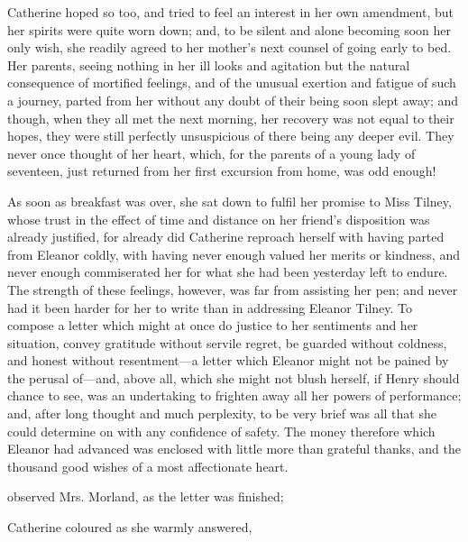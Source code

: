 Catherine hoped so too, and tried to feel an interest in her own amendment, but her spirits were quite worn down; and, to be silent and alone becoming soon her only wish, she readily agreed to her mother's next counsel of going early to bed. Her parents, seeing nothing in her ill looks and agitation but the natural consequence of mortified feelings, and of the unusual exertion and fatigue of such a journey, parted from her without any doubt of their being soon slept away; and though, when they all met the next morning, her recovery was not equal to their hopes, they were still perfectly unsuspicious of there being any deeper evil. They never once thought of her heart, which, for the parents of a young lady of seventeen, just returned from her first excursion from home, was odd enough!

As soon as breakfast was over, she sat down to fulfil her promise to Miss Tilney, whose trust in the effect of time and distance on her friend's disposition was already justified, for already did Catherine reproach herself with having parted from Eleanor coldly, with having never enough valued her merits or kindness, and never enough commiserated her for what she had been yesterday left to endure. The strength of these feelings, however, was far from assisting her pen; and never had it been harder for her to write than in addressing Eleanor Tilney. To compose a letter which might at once do justice to her sentiments and her situation, convey gratitude without servile regret, be guarded without coldness, and honest without resentment---a letter which Eleanor might not be pained by the perusal of---and, above all, which she might not blush herself, if Henry should chance to see, was an undertaking to frighten away all her powers of performance; and, after long thought and much perplexity, to be very brief was all that she could determine on with any confidence of safety. The money therefore which Eleanor had advanced was enclosed with little more than grateful thanks, and the thousand good wishes of a most affectionate heart.

 observed Mrs. Morland, as the letter was finished; 

Catherine coloured as she warmly answered, 

